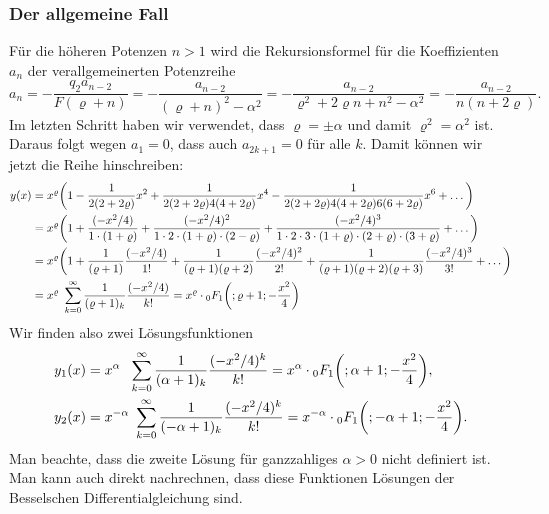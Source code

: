 \subsubsection{Der allgemeine Fall}
Für die höheren Potenzen $n>1$ wird die Rekursionsformel für die
Koeffizienten $a_n$ der verallgemeinerten Potenzreihe
\[
a_{n} =
-\frac{ q_2 a_{n-2} }{F(\varrho+n)}
=
-\frac{a_{n-2}}{(\varrho+n)^2-\alpha^2}
=
-\frac{a_{n-2}}{\varrho^2 + 2\varrho n+n^2-\alpha^2}
=
-\frac{a_{n-2}}{n(n+2\varrho)}.
\]
Im letzten Schritt haben wir verwendet, dass $\varrho=\pm\alpha$
und damit $\varrho^2=\alpha^2$ ist.
Daraus folgt wegen $a_1=0$, dass auch $a_{2k+1}=0$ für alle $k$.
Damit können wir jetzt die Reihe hinschreiben:
\begin{align*}
y(x)
&=
x^{\varrho}\biggl(
1
-
\frac{1}{2(2+2\varrho)} x^2
+
\frac{1}{2(2+2\varrho)4(4+2\varrho)} x^4
-
\frac{1}{2(2+2\varrho)4(4+2\varrho)6(6+2\varrho)} x^6
+
\dots
\biggr)
\\
&=
x^{\varrho}
\biggl(
1
+
\frac{(-x^2/4)}{1\cdot (1+\varrho)}
+
\frac{(-x^2/4)^2}{1\cdot 2\cdot (1+\varrho)\cdot(2-\varrho)}
+
\frac{(-x^2/4)^3}{1\cdot 2\cdot 3\cdot (1+\varrho)\cdot(2+\varrho)\cdot(3+\varrho)}
+
\dots
\biggr)
\\
&=
x^\varrho\biggl(
1
+
\frac{1}{(\varrho+1)}\frac{(-x^2/4)}{1!}
+
\frac{1}{(\varrho+1)(\varrho+2)}\frac{(-x^2/4)^2}{2!}
+
\frac{1}{(\varrho+1)(\varrho+2)(\varrho+3)}\frac{(-x^2/4)^3}{3!}
+
\dots
\biggr)
\\
&=
x^\varrho \sum_{k=0}^\infty
\frac{1}{(\varrho+1)_k} \frac{(-x^2/4)}{k!}
=
x^\varrho
\cdot
\mathstrut_0F_1\biggl(;\varrho+1;-\frac{x^2}{4}\biggr)
\end{align*}
Wir finden also zwei Lösungsfunktionen
\begin{align}
y_1(x)
&=
x^{\alpha\phantom{-}}
\sum_{k=0}^\infty
\frac{1}{(\alpha+1)_k}
\frac{(-x^2/4)^k}{k!}
=
x^\alpha
\cdot
\mathstrut_0F_1\biggl(;\alpha+1;-\frac{x^2}{4}\biggr),
\label{buch:differentialgleichunge:bessel:eqn:erste}
\\
y_2(x)
&=
x^{-\alpha} \sum_{k=0}^\infty
\frac{1}{(-\alpha+1)_k} \frac{(-x^2/4)^k}{k!}
=
x^{-\alpha}
\cdot
\mathstrut_0F_1\biggl(;-\alpha+1;-\frac{x^2}{4}\biggr).
\label{buch:differentialgleichunge:bessel:eqn:zweite}
\end{align}
Man beachte, dass die zweite Lösung für ganzzahliges $\alpha>0$ nicht
definiert ist.
Man kann auch direkt nachrechnen, dass diese Funktionen Lösungen
der Besselschen Differentialgleichung sind.

%
%

